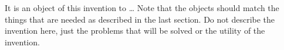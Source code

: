 


\npar It is an object of this invention to \ldots{} Note that the objects should match the things that are needed as described in the last section. Do not describe the invention here, just the problems that will be solved or the utility of the invention.
